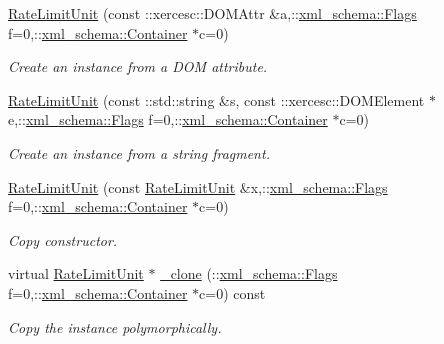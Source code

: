 \begin{DoxyCompactItemize}
\hyperlink{classopenstack_1_1xml_1_1RateLimitUnit_ab6d9b48cd713c71d13210ad5b7a55713}{RateLimitUnit} (const ::xercesc::DOMAttr \&a,::\hyperlink{namespacexml__schema_affb4c227cbd9aa7453dd1dc5a1401943}{xml\_\-schema::Flags} f=0,::\hyperlink{namespacexml__schema_a333dea2213742aea47a37532dec4ec27}{xml\_\-schema::Container} $\ast$c=0)
\begin{DoxyCompactList}\small\item\em Create an instance from a DOM attribute. \item\end{DoxyCompactList}\item 
\hyperlink{classopenstack_1_1xml_1_1RateLimitUnit_a808a74e115ca63eca92c712c513ac507}{RateLimitUnit} (const ::std::string \&s, const ::xercesc::DOMElement $\ast$e,::\hyperlink{namespacexml__schema_affb4c227cbd9aa7453dd1dc5a1401943}{xml\_\-schema::Flags} f=0,::\hyperlink{namespacexml__schema_a333dea2213742aea47a37532dec4ec27}{xml\_\-schema::Container} $\ast$c=0)
\begin{DoxyCompactList}\small\item\em Create an instance from a string fragment. \item\end{DoxyCompactList}\item 
\hyperlink{classopenstack_1_1xml_1_1RateLimitUnit_a45bca7be27bcc1434a2f4ccbd08580b4}{RateLimitUnit} (const \hyperlink{classopenstack_1_1xml_1_1RateLimitUnit}{RateLimitUnit} \&x,::\hyperlink{namespacexml__schema_affb4c227cbd9aa7453dd1dc5a1401943}{xml\_\-schema::Flags} f=0,::\hyperlink{namespacexml__schema_a333dea2213742aea47a37532dec4ec27}{xml\_\-schema::Container} $\ast$c=0)
\begin{DoxyCompactList}\small\item\em Copy constructor. \item\end{DoxyCompactList}\item 
virtual \hyperlink{classopenstack_1_1xml_1_1RateLimitUnit}{RateLimitUnit} $\ast$ \hyperlink{classopenstack_1_1xml_1_1RateLimitUnit_a7961e4b42a5c9f94d395b3922ab59f69}{\_\-clone} (::\hyperlink{namespacexml__schema_affb4c227cbd9aa7453dd1dc5a1401943}{xml\_\-schema::Flags} f=0,::\hyperlink{namespacexml__schema_a333dea2213742aea47a37532dec4ec27}{xml\_\-schema::Container} $\ast$c=0) const 
\begin{DoxyCompactList}\small\item\em Copy the instance polymorphically. \item\end{DoxyCompactList}\item 

\end{DoxyCompactItemize}

